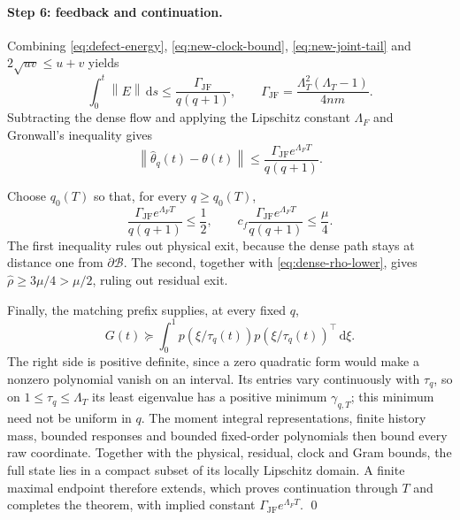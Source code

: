 \documentclass[11pt]{article}
\theoremstyle{definition}
\theoremstyle{remark}
\newcommand{\norm}[1]{\left\lVert #1\right\rVert}
\newcommand{\dd}{\,\mathrm{d}}
\begin{document}
\paragraph{Step 6: feedback and continuation.}
Combining \eqref{eq:defect-energy}, \eqref{eq:new-clock-bound},
\eqref{eq:new-joint-tail} and $2\sqrt{uv}\le u+v$ yields
\begin{equation}
 \int_0^t\norm E\dd s
 \le\frac{\Gamma_{\mathrm{JF}}}{q(q+1)},\qquad
 \Gamma_{\mathrm{JF}}=\frac{\Lambda_T^2(\Lambda_T-1)}{4nm}.     \label{eq:new-sharp-defect}
\end{equation}
Subtracting the dense flow and applying the Lipschitz constant $\Lambda_F$ and Gronwall's
inequality gives
\begin{equation}
 \norm{\widehat\theta_q(t)-\theta(t)}
 \le\frac{\Gamma_{\mathrm{JF}}e^{\Lambda_FT}}{q(q+1)}.                  \label{eq:new-feedback}
\end{equation}

Choose $q_0(T)$ so that, for every $q\ge q_0(T)$,
\begin{equation}
 \frac{\Gamma_{\mathrm{JF}}e^{\Lambda_FT}}{q(q+1)}\le\frac12,\qquad
 c_f\frac{\Gamma_{\mathrm{JF}}e^{\Lambda_FT}}{q(q+1)}\le\frac\mu4.      \label{eq:new-order-condition}
\end{equation}
The first inequality rules out physical exit, because the dense path stays at
distance one from $\partial\mathcal B$.  The second, together with
\eqref{eq:dense-rho-lower}, gives $\widehat\rho\ge3\mu/4>\mu/2$, ruling out
residual exit.

Finally, the matching prefix supplies, at every fixed $q$,
\begin{equation}
 G(t)\succeq\int_0^1p(\xi/\tau_q(t))p(\xi/\tau_q(t))^\top\dd\xi. \label{eq:prefix-gram}
\end{equation}
The right side is positive definite, since a zero quadratic form would make a
nonzero polynomial vanish on an interval.  Its entries vary continuously with
$\tau_q$, so on $1\le \tau_q\le\Lambda_T$ its least eigenvalue has a positive minimum
$\gamma_{q,T}$; this minimum need not be uniform in $q$.  The moment integral
representations, finite history mass, bounded responses and bounded
fixed-order polynomials then bound every raw coordinate.  Together with the
physical, residual, clock and Gram bounds, the full state lies in a compact
subset of its locally Lipschitz domain.  A finite maximal endpoint therefore
extends, which proves continuation through $T$ and completes the theorem,
with implied constant $\Gamma_{\mathrm{JF}}e^{\Lambda_FT}$. \qed
\end{document}
